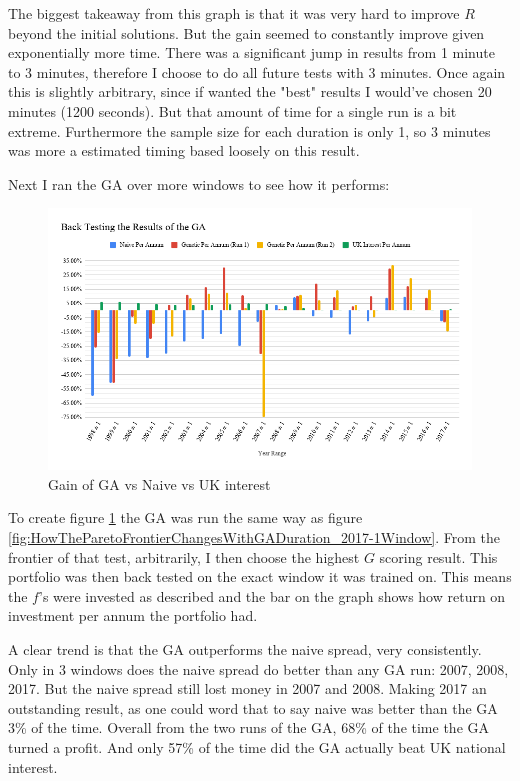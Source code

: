 \documentclass[11pt]{article}
\begin{document}
    The biggest takeaway from this graph is that it was very hard to improve \(R\) beyond
    the initial solutions. But the gain seemed to constantly improve given exponentially
    more time. There was a significant jump in results from 1 minute to 3 minutes,
    therefore I choose to do all future tests with 3 minutes. Once again this is slightly
    arbitrary, since if wanted the "best" results I would've chosen 20 minutes (1200 seconds).
    But that amount of time for a single run is a bit extreme. Furthermore the sample size for
    each duration is only 1, so 3 minutes was more a estimated timing based loosely
    on this result.

    Next I ran the GA over more windows to see how it performs:

    \begin{figure}[H] %
        \includegraphics[width=\textwidth]{BackTestingTheResultsOfTheGA}
        \caption{Gain of GA vs Naive vs UK interest}
            \label{fig:BackTestingTheResultsOfTheGA}
    \end{figure}

    To create figure \ref{fig:BackTestingTheResultsOfTheGA} the GA was run the same way as
    figure \ref{fig:HowTheParetoFrontierChangesWithGADuration_2017-1Window}. From the
    frontier of that test, arbitrarily, I then choose the highest \(G\) scoring result.
    This portfolio was then back tested on the exact window it was trained on. This
    means the \(f\)'s were invested as described and the bar on the graph shows
    how return on investment per annum the portfolio had.

    A clear trend is that the GA outperforms the naive spread, very consistently.
    Only in 3 windows does the naive spread do better than any GA run: 2007, 2008, 2017.
    But the naive spread still lost money in 2007 and 2008. Making 2017 an outstanding result,
    as one could word that to say naive was better than the GA 3\% of the time.
    Overall from the two runs of the GA, 68\% of the time the GA turned a profit.
    And only 57\% of the time did the GA actually beat UK national interest.
\end{document}
